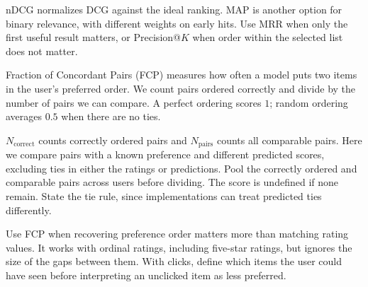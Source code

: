 \metricsecondary

nDCG normalizes DCG against the ideal ranking. MAP is another option for binary relevance, with different weights on early hits. Use MRR when only the first useful result matters, or Precision@$K$ when order within the selected list does not matter.



\metricend
\clearpage
\thispagestyle{rankingstyle}
\label{sec:fcp}

Fraction of Concordant Pairs (FCP) measures how often a model puts two items in the user's preferred order. We count pairs ordered correctly and divide by the number of pairs we can compare. A perfect ordering scores $1$; random ordering averages $0.5$ when there are no ties.

\begin{metricformula}
\end{metricformula}

$N_{\mathrm{correct}}$ counts correctly ordered pairs and $N_{\mathrm{pairs}}$ counts all comparable pairs. Here we compare pairs with a known preference and different predicted scores, excluding ties in either the ratings or predictions. Pool the correctly ordered and comparable pairs across users before dividing. The score is undefined if none remain. State the tie rule, since implementations can treat predicted ties differently.


Use FCP when recovering preference order matters more than matching rating values. It works with ordinal ratings, including five-star ratings, but ignores the size of the gaps between them. With clicks, define which items the user could have seen before interpreting an unclicked item as less preferred.

